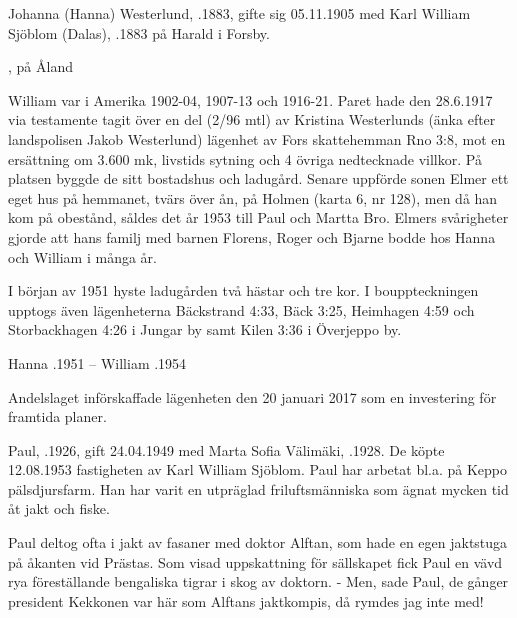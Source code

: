 Johanna (Hanna) Westerlund, .1883, gifte sig 05.11.1905 med Karl William Sjöblom (Dalas), .1883 på Harald i Forsby.
\begin{jhchildren}
  \item {}
  \item {}
  \item {}
  \item {}, på Åland
  \item {}
\end{jhchildren}

William var i Amerika 1902-04, 1907-13 och 1916-21. Paret hade den 28.6.1917 via testamente tagit över en del (2/96 mtl) av Kristina 	Westerlunds (änka efter landspolisen Jakob Westerlund) lägenhet av Fors skattehemman Rno 3:8, mot en ersättning om 3.600 mk, livstids sytning och 4 övriga nedtecknade villkor. På platsen byggde de sitt bostadshus och ladugård. Senare uppförde sonen Elmer ett eget hus på hemmanet, tvärs över ån, på Holmen (karta 6, nr 128), men då han kom på obestånd, såldes det år 1953 till Paul och Martta Bro. Elmers svårigheter gjorde att hans familj med barnen Florens, Roger och Bjarne bodde hos Hanna och William i många år.

I början av 1951 hyste ladugården två hästar och tre kor. I bouppteckningen upptogs även lägenheterna Bäckstrand 4:33, Bäck 3:25, Heimhagen 4:59 och Storbackhagen 4:26 i Jungar by samt Kilen 3:36 i Överjeppo by.

Hanna .1951  -- 	William .1954



Andelslaget införskaffade lägenheten den 20 januari 2017 som en investering för framtida planer.



Paul, .1926, gift 24.04.1949 med Marta Sofia Välimäki, .1928. De köpte 12.08.1953 fastigheten av Karl William Sjöblom. Paul har arbetat bl.a. på Keppo pälsdjursfarm. Han har varit en utpräglad friluftsmänniska som ägnat mycken tid åt jakt och fiske.

Paul deltog ofta i jakt av fasaner med doktor Alftan, som hade en egen jaktstuga på åkanten vid Prästas. Som visad uppskattning för sällskapet fick Paul en vävd rya föreställande bengaliska tigrar i skog av doktorn. - Men, sade Paul, de gånger president Kekkonen var här som Alftans jaktkompis, då rymdes jag inte med!

